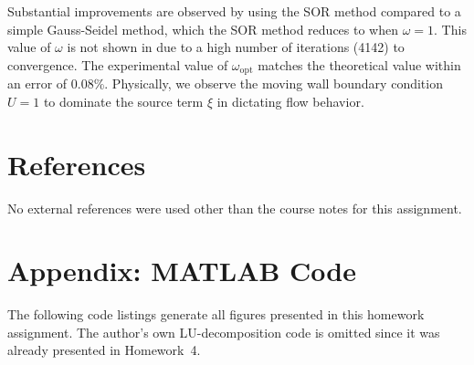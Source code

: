\documentclass[11pt]{article}
\begin{document}
Substantial improvements are observed by using the SOR method compared to a simple Gauss-Seidel method, which the SOR method reduces to when $\omega = 1$. This value of $\omega$ is not shown in  due to a high number of iterations (4142) to convergence. The experimental value of $\omega_\text{opt}$ matches the theoretical value within an error of 0.08\%. Physically, we observe the moving wall boundary condition $U=1$ to dominate the source term $\xi$ in dictating flow behavior.

\section{References} %

No external references were used other than the course notes for this assignment.

\section*{Appendix: MATLAB Code} %

The following code listings generate all figures presented in this homework assignment. The author's own LU-decomposition code is omitted since it was already presented in Homework~4.


\end{document}
